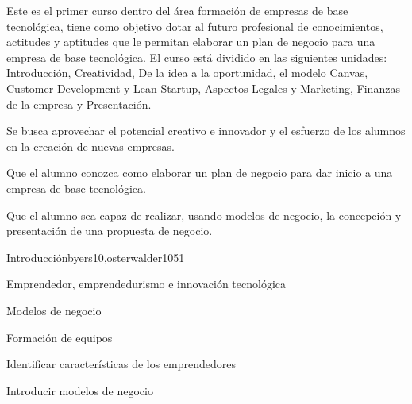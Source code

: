 \begin{syllabus}


\begin{justification}
Este es el primer curso dentro del área formación de empresas de
base tecnológica, tiene como objetivo dotar al futuro profesional 
de conocimientos, actitudes y aptitudes que le
permitan elaborar un plan de negocio para una empresa de base tecnológica.
El curso está dividido en las siguientes unidades:
Introducción, Creatividad, De la idea a la oportunidad, el modelo Canvas, Customer Development y Lean Startup, Aspectos Legales y Marketing, Finanzas de la empresa y Presentación.

Se busca aprovechar el potencial creativo e innovador y el esfuerzo de los alumnos en la creación de nuevas empresas.
\end{justification}

\begin{goals}
\item Que el alumno conozca como elaborar un plan de negocio para dar inicio a una empresa de base tecnológica.
\item Que el alumno sea capaz de realizar, usando modelos de negocio, la concepción y presentación de una propuesta de negocio.
\end{goals}

\begin{outcomes}
\end{outcomes}

\begin{unit}{Introducción}{byers10,osterwalder10}{5}{1}
\begin{topics}
      \item Emprendedor, emprendedurismo e innovación tecnológica
      \item Modelos de negocio
      \item Formación de equipos
   \end{topics}

   \begin{learningoutcomes}
      \item Identificar características de los emprendedores
      \item Introducir modelos de negocio 
   \end{learningoutcomes}
\end{unit}


\end{syllabus}
